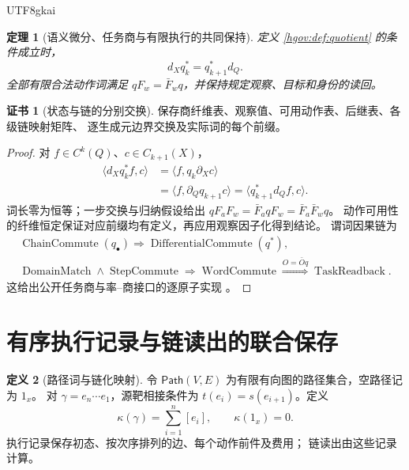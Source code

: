 \documentclass[12pt,a4paper,openany,notitlepage]{report}
\theoremstyle{plain}
\newtheorem{theorem}{定理}[chapter]
\theoremstyle{definition}
\newtheorem{definition}[theorem]{定义}
\newtheorem*{certificate}{证书}
\theoremstyle{remark}
\begin{document}
\begin{CJK*}{UTF8}{gkai}
\begin{theorem}[语义微分、任务商与有限执行的共同保持]
\label{hgov:thm:quotient}
定义 \ref{hgov:def:quotient} 的条件成立时，
\[
d_Xq_k^*=q_{k+1}^*d_Q.
\]
全部有限合法动作词满足 $qF_w=\bar F_wq$，并保持规定观察、目标和身份的读回。
\end{theorem}
\begin{certificate}[状态与链的分别交换]
保存商纤维表、观察值、可用动作表、后继表、各级链映射矩阵、
逐生成元边界交换及实际词的每个前缀。
\end{certificate}
\begin{proof}
对 $f\in C^k(Q)$、$c\in C_{k+1}(X)$，
\[
\begin{aligned}
\langle d_Xq_k^*f,c\rangle
&=\langle f,q_k\partial_Xc\rangle\\
&=\langle f,\partial_Qq_{k+1}c\rangle
=\langle q_{k+1}^*d_Qf,c\rangle.
\end{aligned}
\]
词长零为恒等；一步交换与归纳假设给出
$qF_aF_w=\bar F_aqF_w=\bar F_a\bar F_wq$。
动作可用性的纤维恒定保证对应前缀均有定义，再应用观察因子化得到结论。
谓词因果链为
\[
\begin{gathered}
\operatorname{ChainCommute}(q_\bullet)
\Rightarrow\operatorname{DifferentialCommute}(q^*),\\
\operatorname{DomainMatch}\land\operatorname{StepCommute}
\Rightarrow\operatorname{WordCommute}
\overset{O=\bar Oq}{\Rightarrow}\operatorname{TaskReadback}.
\end{gathered}
\]
这给出公开任务商与率--商接口的逐原子实现 \cite{S38,GFrameworkSynthesis}。
\end{proof}

\section{有序执行记录与链读出的联合保存}

\begin{definition}[路径词与链化映射]
\label{exp:task:word}
令 $\mathsf{Path}(V,E)$ 为有限有向图的路径集合，空路径记为 $1_x$。
对 $\gamma=e_n\cdots e_1$，源靶相接条件为
$t(e_i)=s(e_{i+1})$。定义
\[
 \kappa(\gamma)=\sum_{i=1}^{n}[e_i],\qquad
 \kappa(1_x)=0.
\]
执行记录保存初态、按次序排列的边、每个动作前件及费用；
链读出由这些记录计算。
\end{definition}


\end{CJK*}
\end{document}
